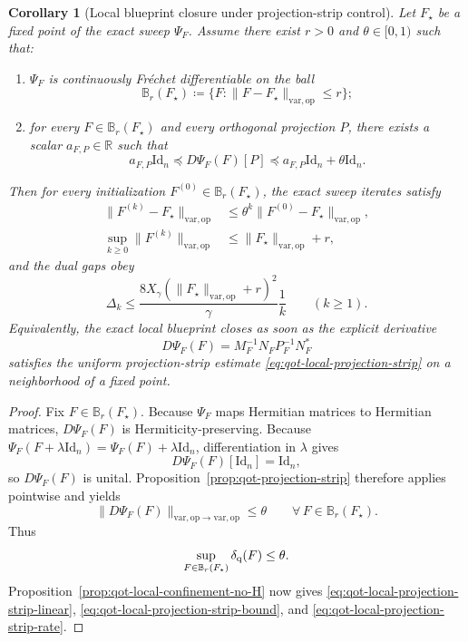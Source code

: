 \documentclass[11pt]{article}
\newcommand{\RR}{\mathbb{R}}
\newcommand{\Id}{\mathrm{Id}}
\newcommand{\eqdef}{\coloneqq}
\newcommand{\op}{\mathrm{op}}
\newcommand{\varop}{\mathrm{var},\op}
\theoremstyle{plain}
\newtheorem{corollary}[proposition]{Corollary}
\begin{document}
\begin{corollary}[Local blueprint closure under projection-strip control]
\label{cor:qot-local-projection-strip-blueprint}
Let $F_\star$ be a fixed point of the exact sweep $\Psi_F$.
Assume there exist $r>0$ and $\theta\in[0,1)$ such that:
\begin{enumerate}[label=\textnormal{(\roman*)}]
\item $\Psi_F$ is continuously Fr\'echet differentiable on the ball
\[
\mathbb B_r(F_\star)
\eqdef
\{F : \|F-F_\star\|_{\varop}\le r\};
\]
\item for every $F\in \mathbb B_r(F_\star)$ and every orthogonal projection $P$, there exists a scalar $a_{F,P}\in \RR$ such that
\begin{equation}
\label{eq:qot-local-projection-strip}
a_{F,P}\Id_n
\preceq
D\Psi_F(F)[P]
\preceq
a_{F,P}\Id_n+\theta \Id_n.
\end{equation}
\end{enumerate}
Then for every initialization $F^{(0)}\in \mathbb B_r(F_\star)$, the exact sweep iterates satisfy
\begin{align}
\|F^{(k)}-F_\star\|_{\varop}
&\le
\theta^k\|F^{(0)}-F_\star\|_{\varop},
\label{eq:qot-local-projection-strip-linear}\\
\sup_{k\ge 0}\|F^{(k)}\|_{\varop}
&\le
\|F_\star\|_{\varop}+r,
\label{eq:qot-local-projection-strip-bound}
\end{align}
and the dual gaps obey
\begin{equation}
\label{eq:qot-local-projection-strip-rate}
\Delta_k
\le
\frac{8X_\gamma(\|F_\star\|_{\varop}+r)^2}{\gamma}\frac{1}{k}
\qquad (k\ge 1).
\end{equation}
Equivalently, the exact local blueprint closes as soon as the explicit derivative
\[
D\Psi_F(F)=M_F^{-1}N_F P_F^{-1}N_F^\ast
\]
satisfies the uniform projection-strip estimate \eqref{eq:qot-local-projection-strip} on a neighborhood of a fixed point.
\end{corollary}

\begin{proof}
Fix $F\in \mathbb B_r(F_\star)$.
Because $\Psi_F$ maps Hermitian matrices to Hermitian matrices, $D\Psi_F(F)$ is Hermiticity-preserving.
Because $\Psi_F(F+\lambda \Id_n)=\Psi_F(F)+\lambda \Id_n$, differentiation in $\lambda$ gives
\[
D\Psi_F(F)[\Id_n]=\Id_n,
\]
so $D\Psi_F(F)$ is unital.
Proposition~\ref{prop:qot-projection-strip} therefore applies pointwise and yields
\[
\|D\Psi_F(F)\|_{\varop\to\varop}\le \theta
\qquad
\forall\, F\in \mathbb B_r(F_\star).
\]
Thus
\[
\sup_{F\in \mathbb B_r(F_\star)}\delta_{\rm q}(F)\le \theta.
\]
Proposition~\ref{prop:qot-local-confinement-no-H} now gives
\eqref{eq:qot-local-projection-strip-linear},
\eqref{eq:qot-local-projection-strip-bound}, and
\eqref{eq:qot-local-projection-strip-rate}.
\end{proof}
\end{document}
